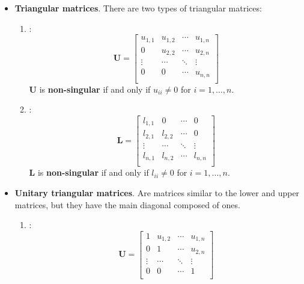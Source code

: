 \begin{itemize}
	\item \textbf{Triangular matrices}. There are two types of triangular matrices:
	\begin{enumerate}
		\item {}:
		\begin{equation*}
			\mathbf{U} = \begin{bmatrix}
				u_{1,1} & u_{1,2} & \cdots & u_{1,n} \\
				0 & u_{2,2} & \cdots & u_{2,n} \\
				\vdots & \cdots & \ddots & \vdots \\
				0 & 0 & \cdots & u_{n,n} \\
			\end{bmatrix}
		\end{equation*}
		$\mathbf{U}$ is \textbf{non-singular} if and only if $u_{ii} \ne 0$ for $i = 1, \dots, n$.

		\item {}:
		\begin{equation*}
			\mathbf{L} = \begin{bmatrix}
				l_{1,1} & 0 & \cdots & 0 \\
				l_{2,1} & l_{2,2} & \cdots & 0 \\
				\vdots & \cdots & \ddots & \vdots \\
				l_{n,1} & l_{n,2} & \cdots & l_{n,n} \\
			\end{bmatrix}
		\end{equation*}
		$\mathbf{L}$ is \textbf{non-singular} if and only if $l_{ii} \ne 0$ for $i = 1, \dots, n$.
	\end{enumerate}
	
	\item \textbf{Unitary triangular matrices}. Are matrices similar to the lower and upper matrices, but they have the main diagonal composed of ones.
	\begin{enumerate}
		\item {}:
		\begin{equation*}
			\mathbf{U} = \begin{bmatrix}
				1 & u_{1,2} & \cdots & u_{1,n} \\
				0 & 1 & \cdots & u_{2,n} \\
				\vdots & \cdots & \ddots & \vdots \\
				0 & 0 & \cdots & 1 \\
			\end{bmatrix}
		\end{equation*}


\end{enumerate}
\end{itemize}
